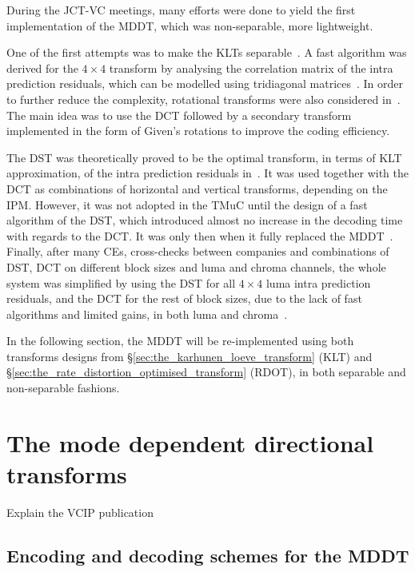 \documentclass[11pt,a4paper,openright,twoside]{book}
\numberwithin{equation}{section} %
\numberwithin{figure}{section} %
\numberwithin{table}{section} %
\begin{document}
During the \ac{JCT-VC} meetings, many efforts were done to yield the
first implementation of the \ac{MDDT}, which was non-separable, more
lightweight.

One of the first attempts was to make the \acp{KLT}
separable~\cite{JCTVC-B024}.
A fast algorithm was derived for the $4\times4$ transform by analysing
the correlation matrix of the intra prediction residuals, which can be
modelled using tridiagonal
matrices~\cite{yueh-05-eigenvalues-tridiagonal}.
In order to further reduce the complexity, rotational transforms were
also considered in~\cite{JCTVC-C096}.
The main idea was to use the \ac{DCT} followed by a secondary transform
implemented in the form of Given's rotations to improve the coding
efficiency.

The \ac{DST} was theoretically proved to be the optimal transform, in
terms of \ac{KLT} approximation, of the intra prediction residuals
in~\cite{JCTVC-C108, JCTVC-D033}.
It was used together with the \ac{DCT} as combinations of horizontal and
vertical transforms, depending on the \ac{IPM}.
However, it was not adopted in the \ac{TMuC} until the design of a fast
algorithm of the \ac{DST}, which introduced almost no increase in the
decoding time with regards to the \ac{DCT}.
It was only then when it fully replaced the \ac{MDDT}~\cite{JCTVC-D048,
JCTVC-E125, JCTVC-F283, JCTVC-G108}.
Finally, after many \acp{CE}, cross-checks between companies and
combinations of \ac{DST}, \ac{DCT} on different block sizes and luma and
chroma channels, the whole system was simplified by using the \ac{DST}
for all $4\times4$ luma intra prediction residuals, and the \ac{DCT} for
the rest of block sizes, due to the lack of fast algorithms and limited
gains, in both luma and chroma~\cite{JCTVC-J0021}.

In the following section, the \ac{MDDT} will be re-implemented using
both transforms designs from \S\ref{sec:the_karhunen_loeve_transform}
(\ac{KLT}) and \S\ref{sec:the_rate_distortion_optimised_transform}
(\ac{RDOT}), in both separable and non-separable fashions.

\section{The mode dependent directional transforms}
\label{sec:the_mode_dependent_directional_transforms}

Explain the VCIP publication~\cite{arrufat-14-mddt-rdot}
\subsection{Encoding and decoding schemes for the \ac{MDDT}}
\label{sub:encoding_and_decoding_schemes_for_the_mddt}
\end{document}

